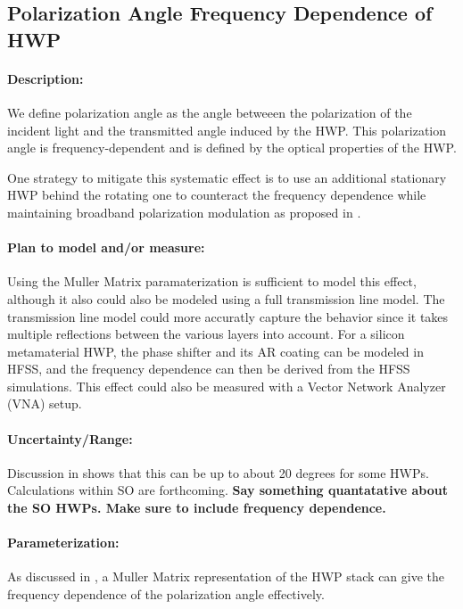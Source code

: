 \subsection{Polarization Angle Frequency Dependence of HWP}

\paragraph{Description:}

We define polarization angle as the angle betweeen the polarization of the incident light and the transmitted angle induced by the HWP. This polarization angle is frequency-dependent and is defined by the optical properties of the HWP.

One strategy to mitigate this systematic effect is to use an additional stationary HWP behind the rotating one to counteract the frequency dependence while maintaining broadband polarization modulation as proposed in \cite{Matsumura14}. 

\paragraph{Plan to model and/or measure:}
Using the Muller Matrix paramaterization is sufficient to model this effect, although it also could also be modeled using a full transmission line model. The transmission line model could more accuratly capture the behavior since it takes multiple reflections between the various layers into account. For a silicon metamaterial HWP, the phase shifter and its AR coating can be modeled in HFSS, and the frequency dependence can then be derived from the HFSS simulations. This effect could also be measured with a Vector Network Analyzer (VNA) setup.

\paragraph{Uncertainty/Range:}
Discussion in \cite{Matsumura09} shows that this can be up to about 20 degrees for some HWPs. Calculations within SO are forthcoming. \textbf{Say something quantatative about the SO HWPs. Make sure to include frequency dependence.}

\paragraph{Parameterization:}

As discussed in \cite{Matsumura09}, a Muller Matrix representation of the HWP stack can give the frequency dependence of the polarization angle effectively.


